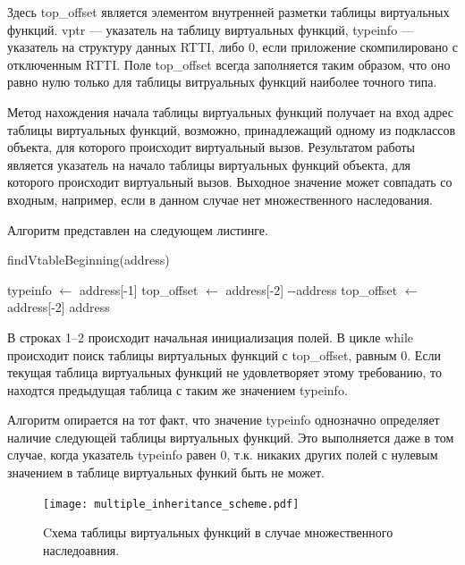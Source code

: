 \documentclass[a4paper,12pt,russian]{article}
\newcommand{\code}[1]{\textsf{#1}}
\begin{document}
Здесь \code{top\_offset} является элементом внутренней разметки таблицы виртуальных функций.
\code{vptr} --- указатель на таблицу виртуальных функций, \code{typeinfo} --- указатель на структуру данных \code{RTTI}, либо $0$, если приложение скомпилировано с отключенным \code{RTTI}.
Поле \code{top\_offset} всегда заполняется таким образом, что оно равно нулю только для таблицы витруальных функций наиболее точного типа.

Метод нахождения начала таблицы виртуальных функций получает на вход адрес таблицы виртуальных функций, возможно, принадлежащий одному из подклассов объекта, для которого происходит виртуальный вызов.
Результатом работы является указатель на начало таблицы виртуальных функций объекта, для которого происходит виртуальный вызов.
Выходное значение может совпадать со входным, например, если в данном случае нет множественного наследования.

Алгоритм представлен на следующем листинге.



\code{findVtableBeginning(address)}
\begin{algorithmic}[1]
\STATE \code{typeinfo} $\leftarrow$ \code{address[-1]}
\STATE \code{top\_offset} $\leftarrow$ \code{address[-2]}
\WHILE{\code{top\_offset} $\neq$ \code{0}}
    \REPEAT
        \STATE \code{-{}-address}
    \UNTIL{\code{address[-1]} $\neq$ \code{typeinfo}}
    \STATE \code{top\_offset} $\leftarrow$ \code{address[-2]}
\ENDWHILE
\RETURN \code{address}
\end{algorithmic}

В строках 1--2 происходит начальная инициализация полей.
В цикле \code{while} происходит поиск таблицы виртуальных функций с \code{top\_offset}, равным 0.
Если текущая таблица виртуальных функций не удовлетворяет этому требованию, то находтся предыдущая таблица с таким же значением \code{typeinfo}.

Алгоритм опирается на тот факт, что значение \code{typeinfo} однозначно определяет наличие следующей таблицы виртуальных функций.
Это выполняется даже в том случае, когда указатель \code{typeinfo} равен 0, т.к. никаких других полей с нулевым значением в таблице виртуальных функий быть не может.

\begin{figure}
  \center
  \texttt{[image: multiple\_inheritance\_scheme.pdf]}
  \hfill
  \caption{Cхема таблицы виртуальных функций в случае множественного наследоавния.}
  \label{multiple_inheritance_scheme_fig}
\end{figure}
\end{document}
